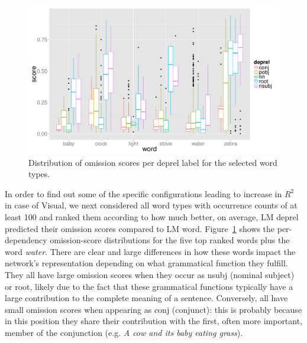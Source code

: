 



\begin{figure}[t]
  \centering
  \includegraphics[scale=0.35]{omission-stat/top_words.pdf}
  \caption{Distribution of omission scores per deprel label for the selected word types.}
  \label{fig:top_words}
\end{figure}

In order to find out some of the specific configurations leading to
increase in $R^2$ in case of {\sc Visual}, we next considered all word types with
occurrence counts of at least 100 and ranked them according to how much
better, on average, {\sc LM deprel} predicted their omission scores 
compared to {\sc LM word}. Figure~\ref{fig:top_words} shows the per-dependency 
omission-score distributions for the five top ranked words plus the word {\it  water}. 
There are clear and large differences in how these words
impact the network's representation depending on what grammatical
function they fulfill. They all have large omission scores when they
occur as {\sc nsubj} (nominal subject) or {\sc root}, likely due to the fact that these
grammatical functions typically have a large contribution to the
complete meaning of a sentence.  Conversely, all have small omission 
scores when appearing as {\sc conj} (conjunct): this is probably because in this position
they share their contribution with the first, often more important,
member of the conjunction (e.g. {\it A cow and its baby eating
  grass}). 
  
